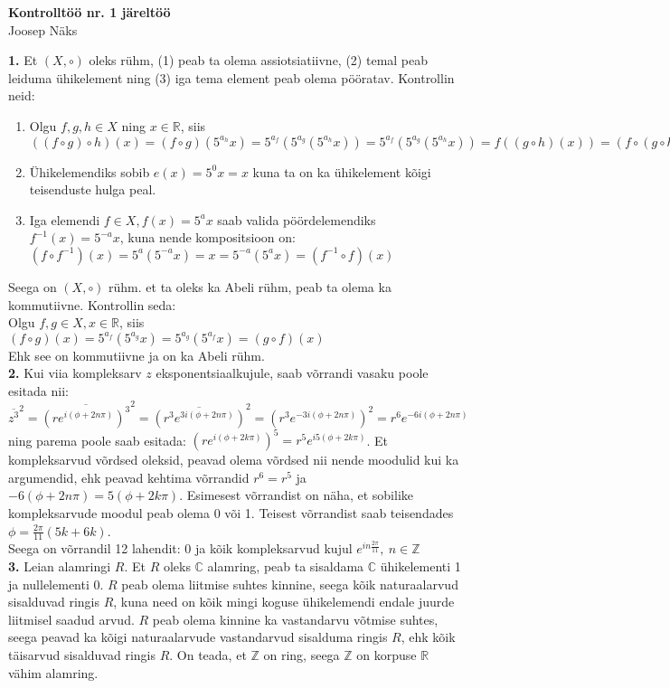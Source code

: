 \documentclass{article}
\begin{document}
\begin{center}
\Large\textbf{Kontrolltöö nr. 1 järeltöö}\\
\small{Joosep Näks}
\end{center}
\textbf{1. } Et $(X, \circ)$ oleks rühm, (1) peab ta olema assiotsiatiivne, (2) temal peab leiduma ühikelement ning (3) iga tema element peab olema pööratav. Kontrollin neid:
\begin{enumerate}
\item Olgu $f,g,h\in X$ ning $x\in\mathbb{R}$, siis $((f\circ g)\circ h) (x)=(f\circ g)(5^{a_h}x)=5^{a_f}(5^{a_g}(5^{a_h}x))=5^{a_f}(5^{a_g}(5^{a_h}x))=f(( g\circ h)(x))=(f\circ (g\circ h)) (x)$\\
\item Ühikelemendiks sobib $e(x)=5^0x=x$ kuna ta on ka ühikelement kõigi teisenduste hulga peal.
\item Iga elemendi $f\in X, f(x)=5^ax$ saab valida pöördelemendiks $f^{-1}(x)=5^{-a}x$, kuna nende kompositsioon on: $(f\circ f^{-1})(x)=5^a(5^{-a}x)=x=5^{-a}(5^ax)=(f^{-1}\circ f)(x)$
\end{enumerate}
Seega on $(X, \circ)$ rühm. et ta oleks ka Abeli rühm, peab ta olema ka kommutiivne. Kontrollin seda:\\
Olgu $f,g\in X, x\in \mathbb{R}$, siis $(f\circ g)(x) = 5^{a_f}(5^{a_g}x)=5^{a_g}(5^{a_f}x)=(g\circ f)(x)$\\
Ehk see on kommutiivne ja on ka Abeli rühm.
\pagebreak\\
\textbf{2.} Kui viia kompleksarv $z$ eksponentsiaalkujule, saab võrrandi vasaku poole esitada nii: $\overline{z^3}^2=\overline{(re^{i(\phi+2n\pi)})^3}^2=\overline{(r^3e^{3i(\phi+2n\pi)})}^2=(r^3e^{-3i(\phi+2n\pi)})^2=r^6e^{-6i(\phi+2n\pi)}$ ning parema poole saab esitada: $(re^{i(\phi+2k\pi)})^5=r^5e^{i5(\phi+2k\pi)}$. Et kompleksarvud võrdsed oleksid, peavad olema võrdsed nii nende moodulid kui ka argumendid, ehk peavad kehtima võrrandid $r^6=r^5$ ja $-6(\phi+2n\pi)=5(\phi+2k\pi)$. Esimesest võrrandist on näha, et sobilike kompleksarvude moodul peab olema 0 või 1. Teisest võrrandist saab teisendades $\phi=\frac{2\pi}{11}(5k+6k)$.\\
Seega on võrrandil 12 lahendit: 0 ja kõik kompleksarvud kujul $e^{in\frac{2\pi}{11}},\ n\in\mathbb{Z}$
\pagebreak\\
\textbf{3.} Leian alamringi $R$. Et $R$ oleks $\mathbb{C}$ alamring, peab ta sisaldama $\mathbb{C}$ ühikelementi 1 ja nullelementi 0. $R$ peab olema liitmise suhtes kinnine, seega kõik naturaalarvud sisalduvad ringis $R$, kuna need on kõik mingi koguse ühikelemendi endale juurde liitmisel saadud arvud. $R$ peab olema kinnine ka vastandarvu võtmise suhtes, seega peavad ka kõigi naturaalarvude vastandarvud sisalduma ringis $R$, ehk kõik täisarvud sisalduvad ringis $R$. On teada, et $\mathbb{Z}$ on ring, seega $\mathbb{Z}$ on korpuse $\mathbb{R}$ vähim alamring.\\
\end{document}

